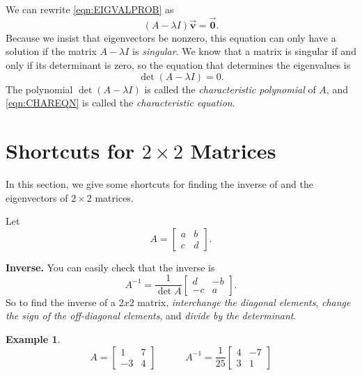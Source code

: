 \documentclass[reqno]{immbook}
\newcommand{\BV}{\vec{\textbf{v}}}
\newcommand{\BZero}{\vec{\textbf{0}}}  %
\numberwithin{equation}{chapter}
\numberwithin{question}{section}
\numberwithin{theorem}{chapter}
\numberwithin{figure}{chapter}
\theoremstyle{definition}
\newtheorem{example}{Example}[section]
\begin{document}
We can rewrite \eqref{eqn:EIGVALPROB} as
\begin{equation}
   \left(A - \lambda I\right) \BV = \BZero.
\end{equation}
Because we insist that eigenvectors be nonzero,
this equation can only have a solution if
the matrix $A-\lambda I$ is \emph{singular}.
We know that a matrix is singular if and only if
its determinant is zero, so the equation that determines
the eigenvalues is
\begin{equation}
   \det\left(A-\lambda I\right) = 0.
   \label{eqn:CHAREQN}
\end{equation}
The polynomial $\det\left(A-\lambda I\right)$ is called
the \emph{characteristic polynomial}
of $A$, and
\eqref{eqn:CHAREQN} is 
called the \emph{characteristic equation}.
\section{Shortcuts for $2\times 2$ Matrices}
In this section, we give
some shortcuts for finding the inverse of and the eigenvectors of $2\times 2$ matrices.

Let
\[
   A = \begin{bmatrix}
              a & b \\ c & d
       \end{bmatrix}.
\]

\noindent
\textbf{Inverse.}
You can easily check that the inverse is
\[
   A^{-1} = \frac{1}{\det A}\begin{bmatrix}
                               d & -b \\ -c & a
                            \end{bmatrix}.
\]
So to find the inverse of a $2x2$ matrix,
\emph{interchange the diagonal elements}, \emph{change the sign of the off-diagonal elements}, and
\emph{divide by the determinant}.

\begin{example}
\[
  A = \begin{bmatrix}
          1 & 7 \\ -3 & 4
      \end{bmatrix}
  \quad\quad\quad
  A^{-1} = \frac{1}{25}\begin{bmatrix}
                          4 & -7 \\ 3 & 1
                       \end{bmatrix}
\]
\end{example}
\end{document}
